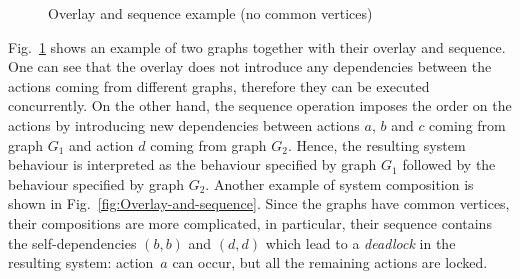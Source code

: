 \begin{figure}[t]
\begin{centering}
{}\hfill{}
\par\end{centering}

\caption{Overlay and sequence example (no common vertices)\label{fig:Overlay-and-sequence-no-common}}
\end{figure}

Fig.~\ref{fig:Overlay-and-sequence-no-common} shows an example of
two graphs together with their overlay and sequence. One can see that
the overlay does not introduce any dependencies between the actions
coming from different graphs, therefore they can be executed concurrently.
On the other hand, the sequence operation imposes the order on the
actions by introducing new dependencies between actions $a$, $b$
and $c$ coming from graph $G_{1}$ and action $d$ coming from graph
$G_{2}$. Hence, the resulting system behaviour is interpreted as
the behaviour specified by graph $G_{1}$ followed by the behaviour
specified by graph $G_{2}$. Another example of system composition
is shown in Fig.~\ref{fig:Overlay-and-sequence}. Since the graphs
have common vertices, their compositions are more complicated, in
particular, their sequence contains the self-dependencies $(b,b)$
and $(d,d)$ which lead to a \emph{deadlock} in the resulting system:
action~$a$ can occur, but all the remaining actions are locked.



